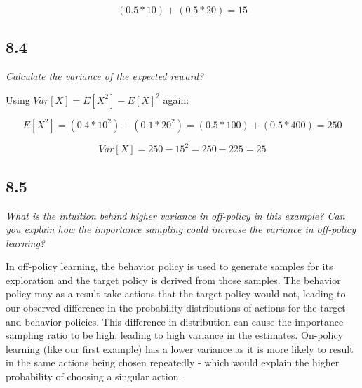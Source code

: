 \documentclass{article}
\begin{document}
\begin{equation}
    (0.5 * 10) + (0.5* 20) = 15
\end{equation}

\subsection*{8.4}

\textit{Calculate the variance of the expected reward?}

Using $Var[X] = E[X^2] - E[X]^2$ again:

\begin{equation}
    E[X^2] = (0.4 * 10^2) + (0.1*20^2) = (0.5*100) + (0.5*400) = 250
\end{equation}

\begin{equation}
    Var[X] = 250 - 15^2 = 250 - 225 = 25
\end{equation}

\subsection*{8.5}

\textit{What is the intuition behind higher variance in off-policy in this example? Can you explain how the importance sampling could increase the variance in off-policy learning?}


In off-policy learning, the behavior policy is used to generate samples for its exploration and the target policy is derived from those samples. The behavior policy may as a result take actions that the target policy would not, leading to our observed difference in the probability distributions of actions for the target and behavior policies. This difference in distribution can cause the importance sampling ratio to be high, leading to high variance in the estimates. On-policy learning (like our first example) has a lower variance as it is more likely to result in the same actions being chosen repeatedly - which would explain the higher probability of choosing a singular action.
\end{document}
